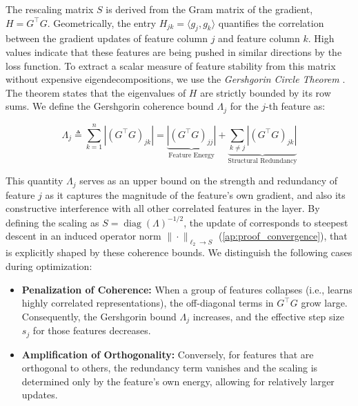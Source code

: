         The rescaling matrix $S$ is derived from the Gram matrix of the gradient, $H = G^\top G$. Geometrically, the entry $H_{jk} = \langle g_j, g_k \rangle$ quantifies the correlation between the gradient updates of feature column $j$ and feature column $k$. High values indicate that these features are being pushed in similar directions by the loss function.
        To extract a scalar measure of feature stability from this matrix without expensive eigendecompositions, we use the \textit{Gershgorin Circle Theorem} \cite{gershgorin1931uber}. The theorem states that the eigenvalues of $H$ are strictly bounded by its row sums. We define the Gershgorin coherence bound $\Lambda_j$ for the $j$-th feature as:
        
        \begin{equation}
            \Lambda_j \triangleq \sum_{k=1}^n |(G^\top G)_{jk}| = \underbrace{|(G^\top G)_{jj}|}_{\text{Feature Energy}} + \underbrace{\sum_{k \ne j} |(G^\top G)_{jk}|}_{\text{Structural Redundancy}}
        \end{equation}
        
        This quantity $\Lambda_j$ serves as an upper bound on the strength and redundancy of feature $j$ as it captures the magnitude of the feature's own gradient, and also its constructive interference with all other correlated features in the layer.
        By defining the scaling as $S = \operatorname{diag}(\Lambda)^{-1/2}$, the update of \turbomuon{}
        corresponds to steepest descent in an induced operator norm $\| \cdot \|_{\ell_2 \rightarrow S}$ (\cref{ap:proof_convergence}), that is explicitly shaped by these coherence bounds. We distinguish the following cases during optimization:
        
        \begin{itemize}
            \item \textbf{Penalization of Coherence:} When a group of features collapses (i.e., learns highly correlated representations), the off-diagonal terms in $G^\top G$ grow large. Consequently, the Gershgorin bound $\Lambda_j$ increases, and the effective step size $s_j$ for those features decreases. 
            \item \textbf{Amplification of Orthogonality:} Conversely, for features that are orthogonal to others, the redundancy term vanishes and the scaling is determined only by the feature's own energy, allowing for relatively larger updates.
        \end{itemize}
        
